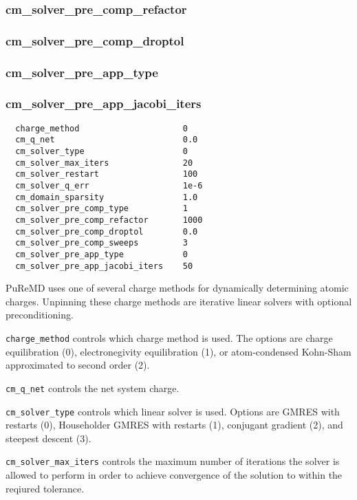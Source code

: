 \documentclass{article}
\begin{document}
\subsubsection{cm\_solver\_pre\_comp\_refactor}
\label{sec:cm_solver_pre_comp_refactor}
\subsubsection{cm\_solver\_pre\_comp\_droptol}
\label{sec:cm_solver_pre_comp_droptol}
\subsubsection{cm\_solver\_pre\_app\_type}
\label{sec:cm_solver_pre_app_type}
\subsubsection{cm\_solver\_pre\_app\_jacobi\_iters}
\label{sec:cm_solver_pre_app_jacobi_iters}

\begin{verbatim}
  charge_method                     0
  cm_q_net                          0.0
  cm_solver_type                    0
  cm_solver_max_iters               20
  cm_solver_restart                 100
  cm_solver_q_err                   1e-6
  cm_domain_sparsity                1.0
  cm_solver_pre_comp_type           1
  cm_solver_pre_comp_refactor       1000
  cm_solver_pre_comp_droptol        0.0
  cm_solver_pre_comp_sweeps         3
  cm_solver_pre_app_type            0
  cm_solver_pre_app_jacobi_iters    50
\end{verbatim}
PuReMD uses one of several charge methods for dynamically
determining atomic charges. Unpinning these charge methods
are iterative linear solvers with optional preconditioning.

{\tt charge\_method} controls which charge method is used.
The options are charge equilibration
(0), electronegivity equilibration (1), or atom-condensed Kohn-Sham
approximated to second order (2).

{\tt cm\_q\_net} controls the net system charge.

{\tt cm\_solver\_type} controls which linear solver is used. Options
are GMRES with restarts (0), Householder GMRES with restarts (1),
conjugant gradient (2), and steepest descent (3).

{\tt cm\_solver\_max\_iters} controls the maximum number of iterations
the solver is allowed to perform in order to achieve convergence of
the solution to within the reqiured tolerance.
\end{document}
